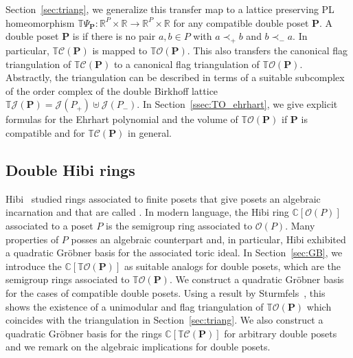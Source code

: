 \documentclass[11pt]{amsart}
\theoremstyle{definition}
\begin{document}
Section~\ref{sec:triang}, we generalize this transfer map to a lattice
preserving PL homeomorphism ${{\mathbb{T}}{\Psi}_{\mathbf{P}}} : {\mathbb{R}}^{P} \times {\mathbb{R}} \rightarrow {\mathbb{R}}^{P}
\times {\mathbb{R}}$ for any compatible double poset ${\mathbf{P}}$. A double poset ${\mathbf{P}}$ is
{\textbf{\color{black}{compatible}}} if there is no pair $a,b \in {P}$ with $a \prec_+ b$ and $b \prec_-
a$.
In particular,
${{\mathbb{T}}{\mathcal{C}({{{\mathbf{P}}}})}}$ is mapped to ${{\mathbb{T}}{\mathcal{O}({\mathbf{P}})}}$. This also transfers the canonical
flag triangulation of ${{\mathbb{T}}{\mathcal{C}({{{\mathbf{P}}}})}}$ to a canonical flag triangulation of
${{\mathbb{T}}{\mathcal{O}({\mathbf{P}})}}$. Abstractly, the triangulation can be described in terms of a
suitable subcomplex of the order complex of the double Birkhoff lattice
${{\mathbb{T}}{{\mathcal{J}}({{\mathbf{P}}})}} = {{\mathcal{J}}({{P}_+})} \uplus {{\mathcal{J}}({{P}_-})}$.  In
Section~\ref{ssec:TO_ehrhart}, we give explicit formulas for the Ehrhart
polynomial and the volume of ${{\mathbb{T}}{\mathcal{O}({\mathbf{P}})}}$ if ${\mathbf{P}}$ is compatible and for
${{\mathbb{T}}{\mathcal{C}({{{\mathbf{P}}}})}}$ in general.

\subsection{Double Hibi rings}
Hibi~\cite{Hibi87} studied rings associated to finite posets that give posets
an algebraic incarnation and that are called {\textbf{\color{black}{Hibi rings}}}. In modern
language, the Hibi ring ${{\mathbb{C}}[{\mathcal{O}({P})}]}$ associated to a poset ${P}$ is the
semigroup ring associated to ${\mathcal{O}({P})}$. Many properties of ${P}$ posses an
algebraic counterpart and, in particular, Hibi exhibited a quadratic Gr\"obner
basis for the associated toric ideal. In Section~\ref{sec:GB}, we introduce
the {\textbf{\color{black}{double Hibi rings}}} ${{\mathbb{C}}[{{\mathbb{T}}{\mathcal{O}({{{\mathbf{P}}}})}}]}$ as suitable analogs for double
posets, which are the semigroup rings associated to ${{\mathbb{T}}{\mathcal{O}({\mathbf{P}})}}$. We construct
a quadratic Gr\"obner basis for the cases of compatible double posets. Using a
result by Sturmfels~\cite[Thm.~8.3]{Sturmfels96}, this shows the existence of
a unimodular and flag triangulation of ${{\mathbb{T}}{\mathcal{O}({\mathbf{P}})}}$ which coincides with the
triangulation in Section~\ref{sec:triang}. We also construct a quadratic
Gr\"obner basis for the rings ${\mathbb{C}}[{{\mathbb{T}}{\mathcal{C}({{{\mathbf{P}}}})}}]$ for arbitrary double posets
and we remark on the algebraic implications for double posets.
\end{document}
